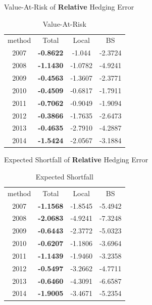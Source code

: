 \documentclass[10pt,table,mathserif]{beamer}
\begin{document}
\begin{frame}{Value-At-Risk of \textbf{Relative} Hedging Error}
\begin{table}[htp!]
	\centering
\begin{tabular}{|c|c|c|c|}
	\hline
	method &Total&Local&BS \\
	2007&\textbf{-0.8622}&-1.044&-2.3724\\
	2008&\textbf{-1.1430}&-1.0782&-4.9241\\
	2009&\textbf{-0.4563}&-1.3607&-2.3771\\
	2010&\textbf{-0.4509}&-0.6817&-1.7911\\
	2011&\textbf{-0.7062}&-0.9049&-1.9094\\
	2012&\textbf{-0.3866}&-1.7635&-2.6473\\
	2013&\textbf{-0.4635}&-2.7910&-4.2887\\
	2014&\textbf{-1.5424}&-2.0567&-3.1884\\
	\hline
\end{tabular}

	\caption{Value-At-Risk}
\end{table}

\end{frame}




\begin{frame}{Expected Shortfall of \textbf{Relative} Hedging Error}
\begin{table}[htp!]
	\centering
		\begin{tabular}{|c|c|c|c|}
		\hline
		method &Total&Local&BS \\
		2007&\textbf{-1.1568}&-1.8545&-5.4942\\
		2008&\textbf{-2.0683}&-4.9241&-7.3248\\
		2009&\textbf{-0.6443}&-2.3772&-5.0323\\
		2010&\textbf{-0.6207}&-1.1806&-3.6964\\
		2011&\textbf{-1.1439}&-1.9460&-3.2358\\
		2012&\textbf{-0.5497}&-3.2662&-4.7711\\
		2013&\textbf{-0.6460}&-4.3091&-6.6587\\
		2014&\textbf{-1.9005}&-3.4671&-5.2354\\
		\hline
	\end{tabular}
	
	\caption{Expected Shortfall}
\end{table}
\end{frame}
\end{document}
